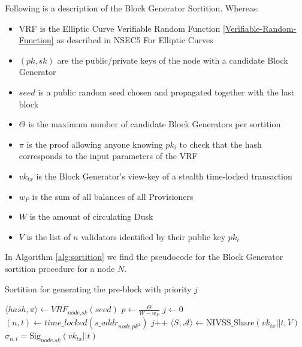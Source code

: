 Following is a description of the Block Generator Sortition. Whereas: 

\begin{itemize}
\item VRF is the Elliptic Curve Verifiable Random Function \ref{Verifiable-Random-Function} as described in NSEC5 For Elliptic Curves \cite{ecurves}
\item $(pk, sk)$ are the public/private keys of the node with a candidate Block Generator
\item $seed$ is a public random seed chosen and propagated together with the last block
\item $\Theta$ is the maximum number of candidate Block Generators per sortition
\item $\pi$ is the proof allowing anyone knowing $pk_i$ to check that the hash corresponds to the input parameters of the VRF
\item $vk_{tx}$ is the Block Generator's view-key of a stealth time-locked transaction
\item $w_P$ is the sum of all balances of all Provisioners
\item $W$ is the amount of circulating \textrm{Dusk}
\item $V$ is the list of $n$ validators identified by their public key $pk_i$
\end{itemize}

In Algorithm \ref{alg:sortition} we find the pseudocode for the Block Generator sortition procedure for a node $N$.

    \begin{algorithm}
        \caption{Sortition for generating the pre-block with priority $j$}
        \label{alg:sortition}
        \begin{algorithmic}[1]
                \State $\langle hash, \pi\rangle \leftarrow VRF_{node.sk}(seed)$
                \State $p \leftarrow \frac{\Theta}{W-w_P}$ 
                \State $j \leftarrow 0$
                \State $(n, t) \leftarrow time\_locked(s\_addr_{node.pk^2})$ 
                \While{$\frac{hash}{2^{len(hash)}} \notin [ \sum_{k=0}^j Pr(k;n,p), \sum_{k=0}^{j+1} Pr(k;n,p))$}
                	\State $j \textrm{++}$
                	\State $\langle S, \mathcal{A} \rangle \leftarrow \textrm{NIVSS\_Share}(vk_{tx}||t, V)$
                	\State $\sigma_{n,t}=\textrm{Sig}_{node.sk}(vk_{tx}|| t)$
                \EndWhile
            \EndProcedure
        \end{algorithmic}
    \end{algorithm}


